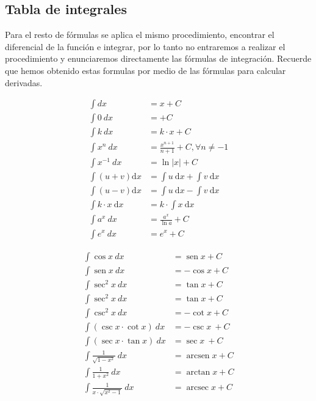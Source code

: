 \documentclass[11pt,letterpaper,oneside]{book}
\numberwithin{equation}{section}
\newcommand{\inv}[1]{\operatorname{arc#1}}
\newcommand{\inti}[2]{\int #1 \text{d}#2}
\newcommand{\intii}[4]{ \int #1 d#4 #3 = #2 +C}
\begin{document}
	\subsection{Tabla de integrales}
	\par
	Para el resto de fórmulas se aplica el mismo procedimiento, encontrar el diferencial de la función e integrar, por lo tanto no entraremos a realizar el procedimiento y enunciaremos directamente las fórmulas de integración. Recuerde que hemos obtenido estas formulas por medio de las fórmulas para calcular derivadas.

	\par
	\begin{minipage}[t]{0.48\linewidth}
		\begin{align}
		\intii{ }{x}{&}{x} \label{idx} \\
		\intii{0 \ }{ }{&}{x} \\
		\intii{k \ }{k \cdot x}{&}{x} \\
		\intii{x^n \ }{ \frac{x^{n+1}}{n+1}}{&}{x}, \forall n \neq -1 \label{ixn} \\
		\intii{x^{-1} \ }{\operatorname{ln} |x|}{&}{x} \label{ix-1} \\
		\inti{(u+v)}{x} &= \inti{u\ }{x} + \inti{v \ }{x}  \label{i+}\\
		\inti{(u-v)}{x} &= \inti{u\ }{x} - \inti{v \ }{x} \\
		\inti{k \cdot x \ }{x} &= k\cdot \inti{x\ }{x}  \label{ikx}\\
		\intii{a^x \ }{ \frac{a^x}{\operatorname{ln}a}}{&}{x} \\
		\intii{e^x \ }{e^x}{&}{x}
		\end{align}
	\end{minipage}
	\begin{minipage}[t]{0.48\linewidth}
		\begin{align}
		\intii{\cos x \ }{\operatorname{sen} x}{&}{x} \\
		\intii{\operatorname{sen} x \ }{-\operatorname{cos}x}{&}{x} \\
		\intii{\operatorname{sec}^2 x \ }{\operatorname{tan} x}{&}{x} \\
		\intii{\operatorname{sec}^2 x \ }{ \operatorname{tan} x}{&}{x} \\
		\intii{\operatorname{csc}^2 x \ }{- \operatorname{cot} x}{&}{x} \\
		\intii{(\operatorname{csc} x \cdot \operatorname{cot} x) \ }{-\operatorname{csc} x \ }{&}{x} \\
		\intii{(\operatorname{sec} x \cdot \operatorname{tan} x) \ }{ \operatorname{sec} x \ }{&}{x} \\
		\intii{\frac{1}{\sqrt{1-x^2}}\ }{\inv{sen}x}{&}{x} \\
		\intii{\frac{1}{1+x^2}\ }{\inv{tan}x}{&}{x} \\
		\intii{\frac{1}{x \cdot \sqrt{x^2-1} }\ }{\inv{sec}x}{&}{x}
		\end{align}
	\end{minipage}
	
\end{document}
